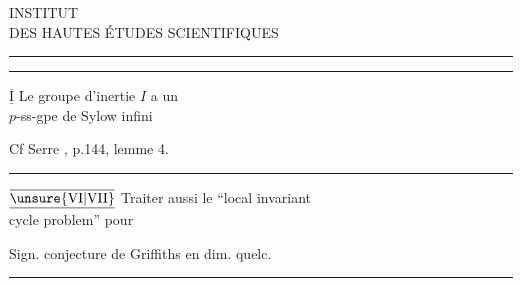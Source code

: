 \begin{center}
INSTITUT\\
DES HAUTES ÉTUDES SCIENTIFIQUES\\[-.3ex]
\rule{1.3cm}{.4pt}
\end{center}


\noindent\rule{.62\linewidth}{.4pt}

$\underline{\overline{\mathrm{I}}}$ \quad Le groupe d'inertie $I$ a un\\
\hspace*{2em}$p$-ss-gpe de Sylow infini

Cf Serre  , p.144, lemme 4.

\noindent\rule{.88\linewidth}{.4pt}

$\underline{\overline{\unsure{\mathrm{VI}|\mathrm{VII}}}}$ \quad Traiter aussi le ``local invariant\\
\hspace*{2em}cycle problem'' pour 

Sign.  conjecture de Griffiths en dim. quelc.

\noindent\rule{.96\linewidth}{.4pt}
